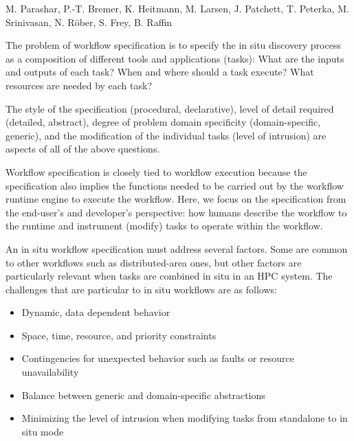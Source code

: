 \license

 M. Parashar, P.-T. Bremer, K. Heitmann, M. Larsen, J. Patchett, T. Peterka, M. Srinivasan, N. Röber, S. Frey, B. Raffin

\begin{refsection}

The problem of workflow specification is to specify the in situ discovery process as a composition of different tools and applications (tasks): What are the inputs and outputs of each task? When and where should a task execute? What resources are needed by each task?

The style of the specification (procedural, declarative), level of detail required (detailed, abstract),  degree of problem domain specificity (domain-specific, generic), and the modification of the individual tasks (level of intrusion) are aspects of all of the above questions.

Workflow specification is closely tied to workflow execution because the specification also implies the functions needed to be carried out by the workflow runtime engine to execute the workflow. Here, we focus on the specification from the end-user’s and developer’s perspective: how humans describe the workflow to the runtime and instrument (modify) tasks to operate within the workflow.

An in situ workflow specification must address several factors. Some are common to other workflows such as distributed-area ones, but other factors are particularly relevant when tasks are combined in situ in an HPC system. The challenges that are particular to in situ workflows are as follows:

\begin{itemize}
\item Dynamic, data dependent behavior
\item Space, time, resource, and priority constraints
\item Contingencies for unexpected behavior such as faults or resource unavailability
\item Balance between generic and domain-specific abstractions
\item Minimizing the level of intrusion when modifying tasks from standalone to in situ mode
\end{itemize}


\end{refsection}
